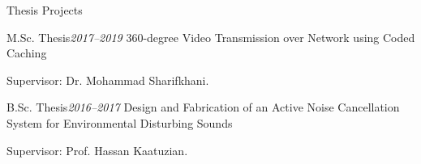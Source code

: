 \documentclass{resume}
\begin{document}

\begin{rSection}{Thesis Projects}
\vspace{+.1cm}

\begin{rSubsection}{M.Sc. Thesis}{\em 2017--2019}
{360-degree Video Transmission over Network using Coded Caching}  

    \item Supervisor: Dr. Mohammad Sharifkhani.
\end{rSubsection}

\pagebreak

\begin{rSubsection}{B.Sc. Thesis}{\em 2016--2017}
{Design and Fabrication of an Active Noise Cancellation System for Environmental Disturbing Sounds}

    \item Supervisor: Prof. Hassan Kaatuzian.
\end{rSubsection}

\end{rSection}

\end{document}

